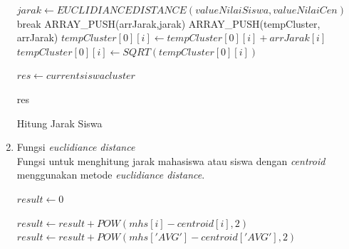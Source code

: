\begin{enumerate}
\begin{algorithm}[H]
\begin{algorithmic}[1]
                                \State $jarak \gets EUCLIDIANCEDISTANCE(valueNilaiSiswa, valueNilaiCen)$
                                    \State break
                                \EndIf
                            \EndFor
                            \State ARRAY\_PUSH(arrJarak,jarak)
                        \EndFor
                            \State ARRAY\_PUSH(tempCluster, arrJarak)
                        \Else
                                \State $tempCluster[0][i] \gets tempCluster[0][i]+ arrJarak[i]$
                                \State $tempCluster[0][i] \gets SQRT(tempCluster[0][i])$
                            \EndFor
                        \EndIf
                    \EndFor
                    
                    \State $res \gets current siswa cluster$
                    
                    \State \Return res
                \EndProcedure
            \end{algorithmic} 
            \caption{Hitung Jarak Siswa}
            \label{alg:hitungJarakSiswa}
        \end{algorithm}
    
    \item Fungsi \textit{euclidiance distance} \\
        Fungsi untuk menghitung jarak mahasiswa atau siswa dengan \textit{centroid} menggunakan metode \textit{euclidiance distance}.\\
        
        \begin{algorithm}[H]
            \begin{algorithmic}[1]
                    \State $result \gets 0$
                    
                        \State $result \gets result + POW(mhs[i]-centroid[i],2)$
                    \EndFor
                    \State $result \gets result + POW(mhs['AVG']-centroid['AVG'],2)$
                    

\end{algorithmic}
\end{algorithm}
\end{enumerate}
